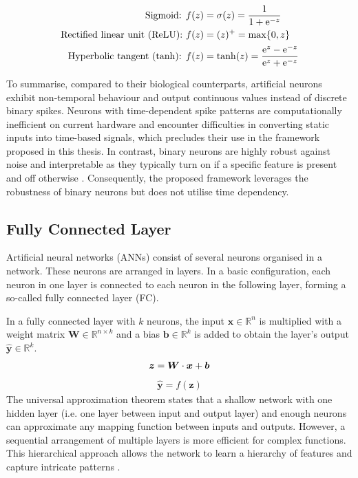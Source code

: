 %
\begin{align}\eqlbl{act_functions}%
		\text{Sigmoid: } & f(z) = \sigma(z) = \frac{1}{1+\mathrm{e}^{-z}}\\
		\text{Rectified linear unit (ReLU): } & f(z) = (z)^{+} = \max\{0, z\}\\
		\text{Hyperbolic tangent (tanh): }  & f(z) = \tanh(z) = \frac{\mathrm{e}^{z}-\mathrm{e}^{-z}}{\mathrm{e}^{z}+\mathrm{e}^{-z}}
\end{align}


To summarise, compared to their biological counterparts, artificial neurons exhibit non-temporal behaviour and output continuous values instead of discrete binary spikes. Neurons with time-dependent spike patterns are computationally inefficient on current hardware and encounter difficulties in converting static inputs into time-based signals, which precludes their use in the framework proposed in this thesis. In contrast, binary neurons are highly robust against noise  and interpretable as they typically turn on if a specific feature is present and off otherwise .
Consequently, the proposed framework leverages the robustness of binary neurons but does not utilise time dependency.


\subsection{Fully Connected Layer}
Artificial neural networks (ANNs) consist of several neurons organised in a network. These neurons are arranged in layers. In a basic configuration, each neuron in one layer is connected to each neuron in the following layer, forming a so-called fully connected layer (FC).

In a fully connected layer with $k$ neurons, the input $\boldsymbol{x} \in \mathbb{R}^n$ is multiplied with a weight matrix $\boldsymbol{W} \in \mathbb{R}^{n\times k}$ and a bias $\boldsymbol{b} \in \mathbb{R}^k$ is added to obtain the layer's output $\boldsymbol{\hat{y}} \in \mathbb{R}^k$.
\begin{align}\eqlbl{nn3}%
	\boldsymbol{z} = \boldsymbol{W} \cdot \boldsymbol{x} + \boldsymbol{b}
\end{align}
\begin{align}
	\hat{\boldsymbol{y}} = f(\boldsymbol{z})
\end{align}
%
The universal approximation theorem  states that a shallow network with one hidden layer (i.e. one layer between input and output layer) and enough neurons can approximate any mapping function between inputs and outputs.
However, a sequential arrangement of multiple layers is more efficient for complex functions. This hierarchical approach allows the network to learn a hierarchy of features and capture intricate patterns .

